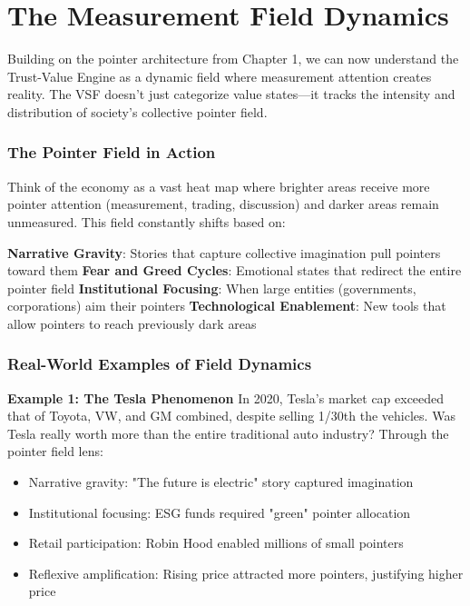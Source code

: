 \documentclass[11pt,oneside]{book}
\begin{document}
\section{The Measurement Field Dynamics}

Building on the pointer architecture from Chapter 1, we can now understand the Trust-Value Engine as a dynamic field where measurement attention creates reality. The VSF doesn't just categorize value states—it tracks the intensity and distribution of society's collective pointer field.

\subsubsection{The Pointer Field in Action}

Think of the economy as a vast heat map where brighter areas receive more pointer attention (measurement, trading, discussion) and darker areas remain unmeasured. This field constantly shifts based on:

\textbf{Narrative Gravity}: Stories that capture collective imagination pull pointers toward them
\textbf{Fear and Greed Cycles}: Emotional states that redirect the entire pointer field
\textbf{Institutional Focusing}: When large entities (governments, corporations) aim their pointers
\textbf{Technological Enablement}: New tools that allow pointers to reach previously dark areas

\subsubsection{Real-World Examples of Field Dynamics}

\textbf{Example 1: The Tesla Phenomenon}
In 2020, Tesla's market cap exceeded that of Toyota, VW, and GM combined, despite selling 1/30th the vehicles. Was Tesla really worth more than the entire traditional auto industry? Through the pointer field lens:
\begin{itemize}
\item Narrative gravity: "The future is electric" story captured imagination
\item Institutional focusing: ESG funds required "green" pointer allocation
\item Retail participation: Robin Hood enabled millions of small pointers
\item Reflexive amplification: Rising price attracted more pointers, justifying higher price
\end{itemize}
\end{document}

